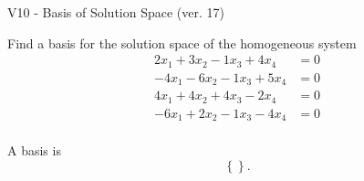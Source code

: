 \begin{exercise}
  \begin{exerciseTitle}V10 - Basis of Solution Space (ver. 17)\end{exerciseTitle}
  \begin{exerciseStatement}
    Find a basis for the solution space of the homogeneous system 
\begin{align*}
 2 x_ 1 + 3 x_ 2 -1 x_ 3 + 4 x_ 4 &= 0  \\ 
  -4 x_ 1 -6 x_ 2 -1 x_ 3 + 5 x_ 4 &= 0  \\ 
  4 x_ 1 + 4 x_ 2 + 4 x_ 3 -2 x_ 4 &= 0  \\ 
  -6 x_ 1 + 2 x_ 2 -1 x_ 3 -4 x_ 4 &= 0  \\ 
 \end{align*}


 
  \end{exerciseStatement}

  \begin{exerciseAnswer}
   A basis is   
\[\left\{\right\}.\]

  


  \end{exerciseAnswer}
\end{exercise}
